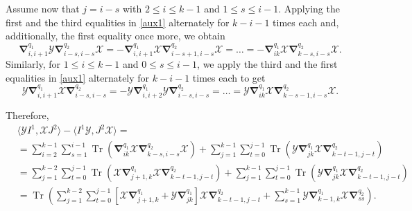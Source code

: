 \documentclass{amsart}
\theoremstyle{definition}
\theoremstyle{remark}
\numberwithin{equation}{section}
\numberwithin{theorem}{section}
\begin{document}
Assume now that $j=i-s$ with $2\leq i\leq k-1$ and $1\leq s\leq i-1$. Applying the first and the third equalities in \eqref{aux1} 
alternately for $k-i-1$ times each and, additionally, the first equality once more, we obtain
\begin{equation*}
{\boldsymbol\nabla}_{i,i+1}^{q_1} {{\mathcal Y}} {\boldsymbol\nabla}_{i-s,i-s}^{q_2} {{\mathcal X}}=-{\boldsymbol\nabla}_{i,i+1}^{q_1} {{\mathcal X}} 
{\boldsymbol\nabla}_{i-s+1,i-s}^{q_2} {{\mathcal X}}=
\ldots=-{\boldsymbol\nabla}_{ik}^{q_1} {{\mathcal X}} {\boldsymbol\nabla}_{k-s,i-s}^{q_2} {{\mathcal X}}. 
\end{equation*}
Similarly, for $1\leq i\leq k-1$ and $0\leq s\leq i-1$, we apply the third and the first equalities in \eqref{aux1} alternately
for $k-i-1$ times each  to get
\begin{equation*}
{{\mathcal Y}}{\boldsymbol\nabla}_{i,i+1}^{q_1} {{\mathcal X}} {\boldsymbol\nabla}_{i-s,i-s}^{q_2} =
-{{\mathcal Y}}{\boldsymbol\nabla}_{i,i+2}^{q_1} {{\mathcal Y}} {\boldsymbol\nabla}_{i-s,i-s}^{q_2}
=\ldots=
{{\mathcal Y}}{\boldsymbol\nabla}_{ik}^{q_1} {{\mathcal X}} {\boldsymbol\nabla}_{k-s-1,i-s}^{q_2} {{\mathcal X}}.
\end{equation*}

Therefore,
\begin{equation*}
\begin{aligned}
& \langle {{\mathcal Y}} I^1,{{\mathcal X}} J^2\rangle  -  \langle I^1{{\mathcal Y}}, J^2{{\mathcal X}}\rangle =
\\
&
= \sum_{i=2}^{k-1} \sum_{s=1}^{i-1}{\operatorname{Tr}}\left( {\boldsymbol\nabla}_{ik}^{q_1} {{\mathcal X}} {\boldsymbol\nabla}_{k-s,i-s}^{q_2} {{\mathcal X}}\right) +
\sum_{j=1}^{k-1} \sum_{t=0}^{j-1} {\operatorname{Tr}}\left({{\mathcal Y}}{\boldsymbol\nabla}_{jk}^{q_1} {{\mathcal X}} {\boldsymbol\nabla}_{k-t-1,j-t}^{q_2}\right) 
\\
& 
= \sum_{j=1}^{k-2} \sum_{t=0}^{j-1}{\operatorname{Tr}}\left({{\mathcal X}} {\boldsymbol\nabla}_{j+1,k}^{q_1} {{\mathcal X}} {\boldsymbol\nabla}_{k-t-1,j-t}^{q_2}\right) 
+\sum_{j=1}^{k-1} \sum_{t=0}^{j-1} {\operatorname{Tr}}\left({{\mathcal Y}}{\boldsymbol\nabla}_{jk}^{q_1} {{\mathcal X}} {\boldsymbol\nabla}_{k-t-1,j-t}^{q_2}\right) 
\\
&
= {\operatorname{Tr}}\left(\sum_{j=1}^{k-2} \sum_{t=0}^{j-1}\left[{{\mathcal X}}{\boldsymbol\nabla}_{j+1,k}^{q_1} + {{\mathcal Y}}{\boldsymbol\nabla}_{jk}^{q_1}\right]
{{\mathcal X}} {\boldsymbol\nabla}_{k-t-1,j-t}^{q_2}  +
\sum_{s=1}^{k-1} {{\mathcal Y}}{\boldsymbol\nabla}_{k-1,k}^{q_1} {{\mathcal X}} {\boldsymbol\nabla}_{ss}^{q_2}\right ). 
\end{aligned}
\end{equation*}
\end{document}
